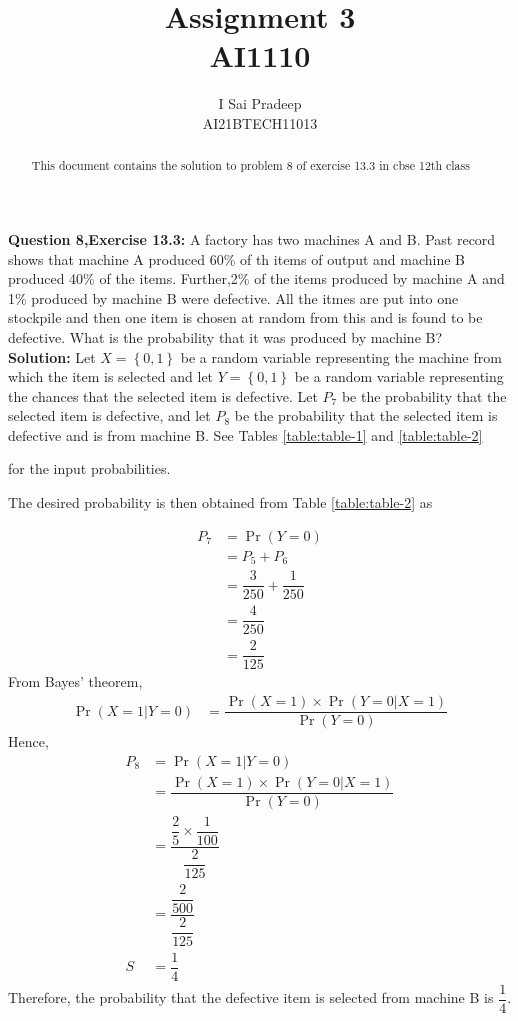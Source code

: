 \documentclass[journal,12pt,twocolumn]{IEEEtran}
\providecommand{\pr}[1]{\ensuremath{\Pr\left(#1\right)}}
\providecommand{\cbrak}[1]{\ensuremath{\left\{#1\right\}}}
\begin{document}
	\title{\huge{Assignment 3}\\AI1110}
	\author{\Large{I Sai Pradeep}\\AI21BTECH11013}
	\maketitle
	\begin{abstract}
		This document contains the solution to problem 8 of exercise 13.3 in cbse  12th class 
	\end{abstract}
	\noindent \textbf{Question 8,Exercise 13.3:}
	A factory has two machines A and B. Past record shows that machine A produced 60\% of th items of output and machine B produced 40\% of the items. Further,2\% of the items produced by machine A and 1\% produced by machine B were defective. All the itmes are put into one stockpile and then one item is chosen at random from this and is found to be defective. What is the probability that it was produced by machine B? \\
	\textbf{Solution:} Let $X=\cbrak{0,1}$ be a random variable representing the machine from which the item is selected and let $Y=\cbrak{0,1}$ be a random variable representing the chances that the selected item is defective. Let $P_7$ be the probability that the selected item is defective, and let $P_8$ be the probability that the selected item is defective and is from machine B.
	See Tables 
	\eqref{table:table-1}
	and 
	\eqref{table:table-2} 
	\begin{table}[ht!]
		
		\vspace*{5pt}
		\caption{}
		\label{table:table-1}
	\end{table}
	\begin{table}[ht!]
		
		\vspace*{5pt}
		\caption{}
		\label{table:table-2}
	\end{table}
	for the input probabilities.
	
	The desired probability is then obtained from Table \eqref{table:table-2} as
	
	\begin{align}
		P_7 &=\pr{Y=0}\\
		    &=P_5+P_6 \\		
		    &= \dfrac{3}{250}+ \dfrac{1}{250}\\
		    &= \dfrac{4}{250}\\
	     	&= \dfrac{2}{125}
	\end{align}
From Bayes' theorem, 
\begin{align}
\pr{X=1|Y=0}
&=\dfrac{\pr{X=1}\times\pr{Y=0|X=1}}{\pr{Y=0}}
\end{align}
Hence,
\begin{align}
	P_8 &=\pr{X=1|Y=0} \\
	&=\dfrac{\pr{X=1}\times\pr{Y=0|X=1}}{\pr{Y=0}}\\
	&= \dfrac{\dfrac{2}{5}\times\dfrac{1}{100}}{\dfrac{2}{125}}\\
	&= \dfrac{\dfrac{2}{500}}{\dfrac{2}{125}}\\S
	&=\dfrac{1}{4}
\end{align}
	Therefore, the probability that the defective item is selected from machine B is $\dfrac{1}{4}$.
\end{document}
